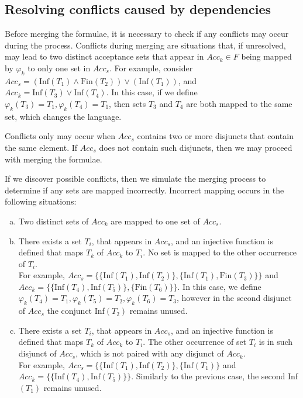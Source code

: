 \documentclass[
  digital, %
  twoside, %
  table,   %
  lof,     %
  lot,     %
]{fithesis3}
\begin{document}
\subsection{Resolving conflicts caused by dependencies}
\label{subsec:resolve_conflicts}
Before merging the formulae, it is necessary to check if any conflicts may occur during the process. Conflicts during merging are situations that, if unresolved, may lead to two distinct acceptance sets that appear in $Acc_k \in F$ being mapped by $\varphi_k$ to only one set in $Acc_s$. For example, consider $Acc_s = (\text{Inf}(T_1) \wedge \text{Fin}(T_2)) \vee (\text{Inf}(T_1))$, and $Acc_k = \text{Inf}(T_3) \vee \text{Inf}(T_4)$. In this case, if we define $\varphi_k (T_3) = T_1, \varphi_k(T_4) = T_1$, then sets $T_3$ and $T_4$ are both mapped to the same set, which changes the language.   

Conflicts only may occur when $Acc_s$ contains two or more disjuncts that contain the same element. If $Acc_s$ does not contain such disjuncts, then we may proceed with merging the formulae. 
 
If we discover possible conflicts, then we simulate the merging process to determine if any sets are mapped incorrectly. Incorrect mapping occurs in the following situations:
\begin{enumerate}[a)]
  \item Two distinct sets of $Acc_k$ are mapped to one set of $Acc_s$.
  \item There exists a set $T_i$, that appears in $Acc_s$, and an injective function is defined that maps $T_k$ of $Acc_k$ to $T_i$. No set is mapped to the other occurrence of $T_i$. \\
  For example, $Acc_s = \{\{\text{Inf}(T_1), \text{Inf}(T_2)\}, \{\text{Inf}(T_1), \text{Fin}(T_3)\}\}$ and $Acc_k = \{\{\text{Inf}(T_4), \text{Inf}(T_5)\}, \{\text{Fin}(T_6)\}\}$. In this case, we define $\varphi_k (T_4) = T_1, \varphi_k (T_5) = T_2, \varphi_k (T_6) = T_3$, however in the second disjunct of $Acc_s$ the conjunct Inf$(T_2)$ remains unused.
  \item There exists a set $T_i$, that appears in $Acc_s$, and an injective function is defined that maps $T_k$ of $Acc_k$ to $T_i$. The other occurrence of set $T_i$ is in such disjunct of $Acc_s$, which is not paired with any disjunct of $Acc_k$. \\
  For example, $Acc_s = \{\{\text{Inf}(T_1), \text{Inf}(T_2)\}, \{\text{Inf}(T_1)\}$ and $Acc_k = \{\{\text{Inf}(T_4), \text{Inf}(T_5)\}\}$. Similarly to the previous case, the second Inf$(T_1)$ remains unused. 
\end{enumerate}
\end{document}
